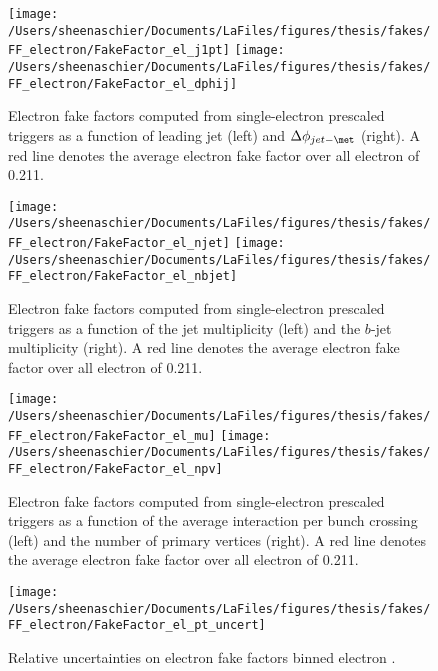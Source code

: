 \begin{figure}[tbp]
  \centering
  \texttt{[image: /Users/sheenaschier/Documents/LaFiles/figures/thesis/fakes/FF\_electron/FakeFactor\_el\_j1pt]}
  \texttt{[image: /Users/sheenaschier/Documents/LaFiles/figures/thesis/fakes/FF\_electron/FakeFactor\_el\_dphij]}\\
  \caption{Electron fake factors computed from single-electron prescaled triggers as a function of leading jet \pt{} (left) and $\Delta\phi_{jet-\met}$ (right). A red line denotes the average electron fake factor over all electron \pt{} of 0.211.}
  \label{fig:elec_FF_hadronic}
\end{figure}

\begin{figure}[tbp]
  \centering
  \texttt{[image: /Users/sheenaschier/Documents/LaFiles/figures/thesis/fakes/FF\_electron/FakeFactor\_el\_njet]}
  \texttt{[image: /Users/sheenaschier/Documents/LaFiles/figures/thesis/fakes/FF\_electron/FakeFactor\_el\_nbjet]}\\
  \caption{Electron fake factors computed from single-electron prescaled triggers as a function of the jet multiplicity (left) and the $b$-jet multiplicity (right). A red line denotes the average electron fake factor over all electron \pt{} of 0.211.}
  \label{fig:elec_FF_njet}
\end{figure}


\begin{figure}[tbp]
  \centering
  \texttt{[image: /Users/sheenaschier/Documents/LaFiles/figures/thesis/fakes/FF\_electron/FakeFactor\_el\_mu]}
  \texttt{[image: /Users/sheenaschier/Documents/LaFiles/figures/thesis/fakes/FF\_electron/FakeFactor\_el\_npv]}\\
  \caption{Electron fake factors computed from single-electron prescaled triggers as a function of the average interaction per bunch crossing (left) and the number of primary vertices (right). A red line denotes the average electron fake factor over all electron \pt{} of 0.211.}
  \label{fig:elec_FF_pileup}
\end{figure}

\begin{figure}[tbp]
  \centering
  \texttt{[image: /Users/sheenaschier/Documents/LaFiles/figures/thesis/fakes/FF\_electron/FakeFactor\_el\_pt\_uncert]}\\
  \caption{Relative uncertainties on electron fake factors binned electron \pt{}.}
  \label{fig:elec_FF_rel_uncert}
\end{figure}

